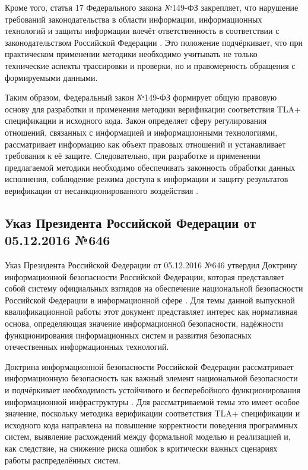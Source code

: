 Кроме того, статья 17 Федерального закона №149-ФЗ закрепляет, что
нарушение требований законодательства в области информации,
информационных технологий и защиты информации влечёт ответственность в
соответствии с законодательством Российской Федерации \cite{fz149_info}.
Это положение подчёркивает, что при практическом применении методики
необходимо учитывать не только технические аспекты трассировки и проверки,
но и правомерность обращения с формируемыми данными.

Таким образом, Федеральный закон №149-ФЗ формирует общую правовую основу
для разработки и применения методики верификации соответствия TLA+
спецификации и исходного кода. Закон определяет сферу регулирования
отношений, связанных с информацией и информационными технологиями,
рассматривает информацию как объект правовых отношений и устанавливает
требования к её защите. Следовательно, при разработке и применении
предлагаемой методики необходимо обеспечивать законность обработки данных
исполнения, соблюдение режима доступа к информации и защиту результатов
верификации от несанкционированного воздействия \cite{fz149_info}.

\subsection{Указ Президента Российской Федерации от 05.12.2016 №646}

Указ Президента Российской Федерации от 05.12.2016 №646 утвердил
Доктрину информационной безопасности Российской Федерации, которая
представляет собой систему официальных взглядов на обеспечение
национальной безопасности Российской Федерации в информационной сфере
\cite{doctrine_ib_rf}. Для темы данной выпускной квалификационной работы
этот документ представляет интерес как нормативная основа, определяющая
значение информационной безопасности, надёжности функционирования
информационных систем и развития безопасных отечественных информационных
технологий.

Доктрина информационной безопасности Российской Федерации рассматривает
информационную безопасность как важный элемент национальной безопасности и
подчёркивает необходимость устойчивого и бесперебойного функционирования
информационной инфраструктуры \cite{doctrine_ib_rf}. Для рассматриваемой
темы это имеет особое значение, поскольку методика верификации
соответствия TLA+ спецификации и исходного кода направлена на повышение
корректности поведения программных систем, выявление расхождений между
формальной моделью и реализацией и, как следствие, на снижение риска
ошибок в критически важных сценариях работы распределённых систем.

